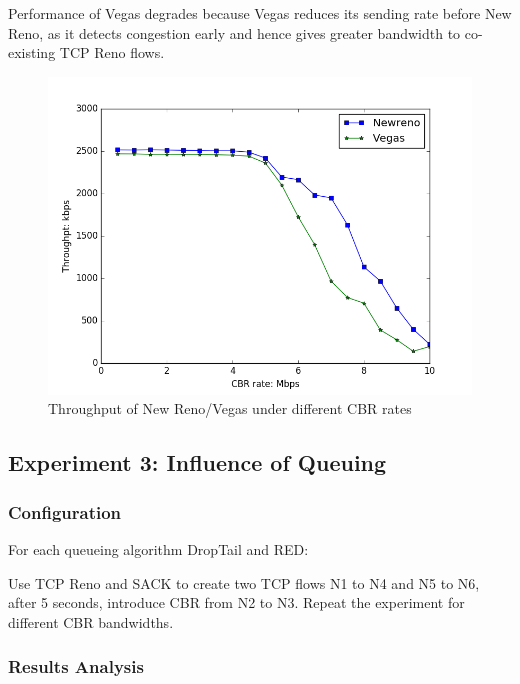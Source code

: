 \documentclass[10pt, conference]{IEEEtran/IEEEtran}
\begin{document}
Performance of Vegas degrades because Vegas reduces its sending rate before New Reno, as it detects congestion early and hence gives greater bandwidth to co-existing TCP Reno flows.
\begin{figure}[!h]
\begin{center}
\includegraphics[width=\linewidth]{../exp2/exp2_Newreno_Vegas_thpt.png}
\caption{Throughput of New Reno/Vegas under different CBR rates}
\label{exp2_NewReno_Vegas_thpt}
\end{center}
\end{figure}




\subsection{Experiment 3: Influence of Queuing}

\subsubsection{Configuration}

For each queueing algorithm DropTail and RED:

Use TCP Reno and SACK to create two TCP flows N1 to N4 and N5 to N6, after 5 
seconds, introduce CBR from N2 to N3. Repeat the experiment for different CBR 
bandwidths.

\subsubsection{Results Analysis}
\end{document}
